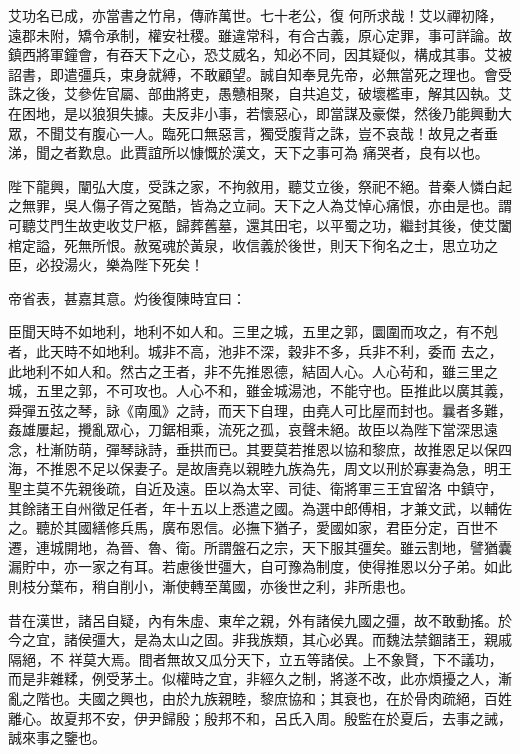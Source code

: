 \begin{pinyinscope}
 艾功名已成，亦當書之竹帛，傳祚萬世。七十老公，復
 何所求哉！艾以禪初降，遠郡未附，矯令承制，權安社稷。雖違常科，有合古義，原心定罪，事可詳論。故鎮西將軍鐘會，有吞天下之心，恐艾威名，知必不同，因其疑似，構成其事。艾被詔書，即遣彊兵，束身就縛，不敢顧望。誠自知奉見先帝，必無當死之理也。會受誅之後，艾參佐官屬、部曲將吏，愚戇相聚，自共追艾，破壞檻車，解其囚執。艾在困地，是以狼狽失據。夫反非小事，若懷惡心，即當謀及豪傑，然後乃能興動大眾，不聞艾有腹心一人。臨死口無惡言，獨受腹背之誅，豈不哀哉！故見之者垂涕，聞之者歎息。此賈誼所以慷慨於漢文，天下之事可為
 痛哭者，良有以也。



 陛下龍興，闡弘大度，受誅之家，不拘敘用，聽艾立後，祭祀不絕。昔秦人憐白起之無罪，吳人傷子胥之冤酷，皆為之立祠。天下之人為艾悼心痛恨，亦由是也。謂可聽艾門生故吏收艾尸柩，歸葬舊墓，還其田宅，以平蜀之功，繼封其後，使艾闔棺定謚，死無所恨。赦冤魂於黃泉，收信義於後世，則天下徇名之士，思立功之臣，必投湯火，樂為陛下死矣！



 帝省表，甚嘉其意。灼後復陳時宜曰：



 臣聞天時不如地利，地利不如人和。三里之城，五里之郭，圜圍而攻之，有不剋者，此天時不如地利。城非不高，池非不深，穀非不多，兵非不利，委而
 去之，此地利不如人和。然古之王者，非不先推恩德，結固人心。人心茍和，雖三里之城，五里之郭，不可攻也。人心不和，雖金城湯池，不能守也。臣推此以廣其義，舜彈五弦之琴，詠《南風》之詩，而天下自理，由堯人可比屋而封也。曩者多難，姦雄屢起，攪亂眾心，刀鋸相乘，流死之孤，哀聲未絕。故臣以為陛下當深思遠念，杜漸防萌，彈琴詠詩，垂拱而已。其要莫若推恩以協和黎庶，故推恩足以保四海，不推恩不足以保妻子。是故唐堯以親睦九族為先，周文以刑於寡妻為急，明王聖主莫不先親後疏，自近及遠。臣以為太宰、司徒、衛將軍三王宜留洛
 中鎮守，其餘諸王自州徵足任者，年十五以上悉遣之國。為選中郎傅相，才兼文武，以輔佐之。聽於其國繕修兵馬，廣布恩信。必撫下猶子，愛國如家，君臣分定，百世不遷，連城開地，為晉、魯、衛。所謂盤石之宗，天下服其彊矣。雖云割地，譬猶囊漏貯中，亦一家之有耳。若慮後世彊大，自可豫為制度，使得推恩以分子弟。如此則枝分葉布，稍自削小，漸使轉至萬國，亦後世之利，非所患也。



 昔在漢世，諸呂自疑，內有朱虛、東牟之親，外有諸侯九國之彊，故不敢動搖。於今之宜，諸侯彊大，是為太山之固。非我族類，其心必異。而魏法禁錮諸王，親戚隔絕，不
 祥莫大焉。間者無故又瓜分天下，立五等諸侯。上不象賢，下不議功，而是非雜糅，例受茅土。似權時之宜，非經久之制，將遂不改，此亦煩擾之人，漸亂之階也。夫國之興也，由於九族親睦，黎庶協和；其衰也，在於骨肉疏絕，百姓離心。故夏邦不安，伊尹歸殷；殷邦不和，呂氏入周。殷監在於夏后，去事之誡，誠來事之鑒也。




\end{pinyinscope}
